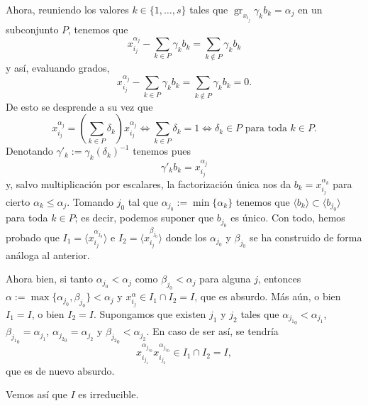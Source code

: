 \documentclass[../main.tex]{subfiles}
\begin{document}
Ahora, reuniendo los valores $k\in\{1,\dots,s\}$ tales que $\operatorname{gr}_{x_{i_j}}\gamma_kb_k=\alpha_j$ en un subconjunto $P$, tenemos que
$$x_{i_j}^{\alpha_j}-\sum_{k\in P}\gamma_kb_k=\sum_{k\notin P}\gamma_kb_k$$
y así, evaluando grados,
$$x_{i_j}^{\alpha_j}-\sum_{k\in P}\gamma_kb_k=\sum_{k\notin P}\gamma_kb_k=0.$$
De esto se desprende a su vez que
$$x_{i_j}^{\alpha_j}=\left(\sum_{k\in P}\delta_k\right)x_{i_j}^{\alpha_j}\Leftrightarrow \sum_{k\in P}\delta_k=1\Leftrightarrow \delta_k\in P\text{ para toda }k\in P.$$
Denotando $\gamma'_k:=\gamma_k(\delta_k)^{-1}$ tenemos pues
$$\gamma'_kb_k=x_{i_j}^{\alpha_j}$$
y, salvo multiplicación por escalares, la factorización única nos da $b_k=x_{i_j}^{\alpha_k}$ para cierto $\alpha_k\le\alpha_j.$ Tomando $j_0$ tal que $\alpha_{j_0}:=\min\{\alpha_k\}$ tenemos que $\langle b_k\rangle\subset\langle b_{j_0}\rangle$ para toda $k\in P$; es decir, podemos suponer que $b_{j_0}$ es único. Con todo, hemos probado que $I_1=\langle x_{i_j}^{\alpha_{j_0}}\rangle$ e $I_2=\langle x_{i_j}^{\beta_{j_0}}\rangle$ donde los $\alpha_{j_0}$ y $\beta_{j_0}$ se ha construido de forma análoga al anterior.

Ahora bien, si tanto $\alpha_{j_0}<\alpha_j$ como $\beta_{j_0}<\alpha_j$ para alguna $j$, entonces $\alpha:=\max\{\alpha_{j_0},\beta_{j_0}\}<\alpha_j$ y $x_{i_j}^{\alpha}\in I_1\cap I_2=I$, que es absurdo. Más aún, o bien $I_1=I$, o bien $I_2=I.$ Supongamos que existen $j_1$ y $j_2$ tales que $\alpha_{{j_1}_0}<\alpha_{j_1}$, $\beta_{{j_1}_0}=\alpha_{j_1}$, $\alpha_{{j_2}_0}=\alpha_{j_2}$ y $\beta_{{j_2}_0}<\alpha_{j_2}.$ En caso de ser así, se tendría $$x_{i_{j_1}}^{\alpha_{{j_1}_0}}x_{i_{j_2}}^{\alpha_{{j_2}_0}}\in I_1\cap I_2=I,$$ que es de nuevo absurdo.

Vemos así que $I$ es irreducible.
\end{document}

